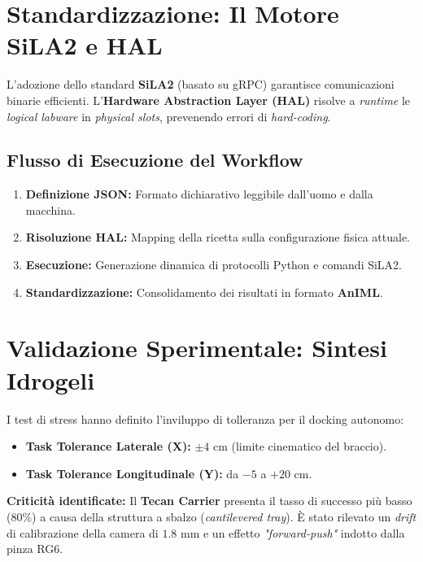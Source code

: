 \documentclass[a4paper,11pt]{article}
\begin{document}
	\section{Standardizzazione: Il Motore SiLA2 e HAL}
	L'adozione dello standard \textbf{SiLA2} (basato su gRPC) garantisce comunicazioni binarie efficienti. L'\textbf{Hardware Abstraction Layer (HAL)} risolve a \textit{runtime} le \textit{logical labware} in \textit{physical slots}, prevenendo errori di \textit{hard-coding}.
	
	\subsection{Flusso di Esecuzione del Workflow}
	\begin{enumerate}
		\item \textbf{Definizione JSON:} Formato dichiarativo leggibile dall'uomo e dalla macchina.
		\item \textbf{Risoluzione HAL:} Mapping della ricetta sulla configurazione fisica attuale.
		\item \textbf{Esecuzione:} Generazione dinamica di protocolli Python e comandi SiLA2.
		\item \textbf{Standardizzazione:} Consolidamento dei risultati in formato \textbf{AnIML}.
	\end{enumerate}
	
	\section{Validazione Sperimentale: Sintesi Idrogeli}
	I test di stress hanno definito l'inviluppo di tolleranza per il docking autonomo:
	\begin{itemize}
		\item \textbf{Task Tolerance Laterale (X):} $\pm 4$ cm (limite cinematico del braccio).
		\item \textbf{Task Tolerance Longitudinale (Y):} da $-5$ a $+20$ cm.
	\end{itemize}
	
	\textbf{Criticità identificate:} Il \textbf{Tecan Carrier} presenta il tasso di successo più basso (80\%) a causa della struttura a sbalzo (\textit{cantilevered tray}). È stato rilevato un \textit{drift} di calibrazione della camera di $1.8$ mm e un effetto \textit{"forward-push"} indotto dalla pinza RG6.
	
\end{document}
